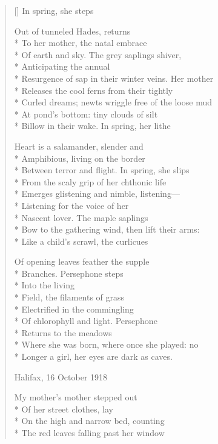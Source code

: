 \label{ch:by_the_laughless_rock}
\settowidth{\versewidth}{[Title reflects corrected year of my mother's birth. I'm  pretty sure this is the correct year.]}
\begin{verse}[\versewidth]
                      In spring, she steps

Out of tunneled Hades, returns\\*
To her mother, the natal embrace\\*
Of earth and sky.     The grey saplings shiver,\\*
Anticipating the annual\\*
Resurgence of sap in their winter veins.   Her mother\\*
Releases the cool ferns from their tightly\\*
Curled dreams; newts wriggle free of the loose mud\\*
At pond's bottom:     tiny clouds of silt\\*
Billow in their wake.  In spring, her lithe

Heart is a salamander, slender and\\*
Amphibious, living on the border\\*
Between terror and flight.     In spring, she slips\\*
From the scaly grip of her chthonic life\\*
Emerges glistening and nimble, listening---\\*
Listening for the voice of her\\*
Nascent lover.     The maple saplings\\*
Bow to the gathering wind,    then lift their arms:\\*
Like a child's scrawl, the curlicues

Of opening leaves feather the supple\\*
Branches.     Persephone steps\\*
Into the living\\*
Field, the filaments of grass\\*
Electrified in the commingling\\*
Of chlorophyll and light.     Persephone\\*
Returns to the meadows\\*
Where she was born, where once she played: no\\*
Longer a girl, her eyes are dark as caves.

Halifax, 16 October 1918

My mother's mother stepped out\\*
Of her street clothes, lay\\*
On the high and narrow bed, counting\\*
The red leaves falling past her window


\end{verse}

